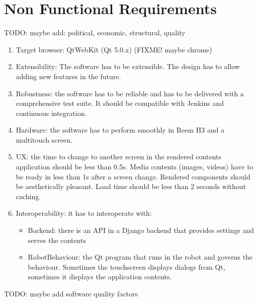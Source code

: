 \section{Non Functional Requirements}
TODO: maybe add: political, economic, structural, quality
\begin{enumerate}
    \item Target browser: QtWebKit (Qt 5.0.x) (FIXME! maybe chrome)
    \item Extensibility: The software has to be extensible. The design has to allow adding new features in the future.
    \item Robustness: the software has to be reliable and has to be delivered with a comprehensive test suite. It should be compatible with Jenkins and continuous integration.
    \item Hardware: the software has to perform smoothly in Reem H3 and a multitouch screen.
    \item \ac{UX}: the time to change to another screen in the rendered contents application should be less than 0.5s. Media contents (images, videos) have to be ready in less than 1s after a screen change. Rendered components should be aesthetically pleasant. Load time should be less than 2 seconds without caching.
    \item Interoperability: it has to interoperate with:
    \begin{itemize}
        \item Backend: there is an \ac{API} in a Django backend that provides settings and serves the contents
        \item RobotBehaviour: the Qt program that runs in the robot and governs the behaviour. Sometimes the touchscreen displays dialogs from Qt, sometimes it displays the application contents. 
    \end{itemize}
\end{enumerate}

TODO: maybe add software quality factors